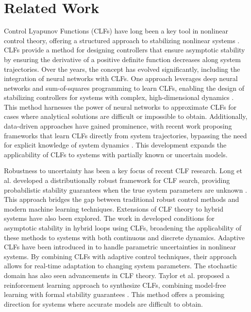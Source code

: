 \documentclass[11pt, oneside]{article}
\begin{document}
\section{Related Work}

 Control Lyapunov Functions (CLFs) have long been a key tool in nonlinear control theory, offering a structured approach to stabilizing nonlinear systems \cite{artstein1983stabilization,sontag1989universal}. CLFs provide a method for designing controllers that ensure asymptotic stability by ensuring the derivative of a positive definite function decreases along system trajectories. Over the years, the concept has evolved significantly, including the integration of neural networks with CLFs. One approach leverages deep neural networks and sum-of-squares programming to learn CLFs, enabling the design of stabilizing controllers for systems with complex, high-dimensional dynamics \cite{richards2018lyapunov}. This method harnesses the power of neural networks to approximate CLFs for cases where analytical solutions are difficult or impossible to obtain. Additionally, data-driven approaches have gained prominence, with recent work proposing frameworks that learn CLFs directly from system trajectories, bypassing the need for explicit knowledge of system dynamics \cite{ravanbakhsh2019learning}. This development expands the applicability of CLFs to systems with partially known or uncertain models.

Robustness to uncertainty has been a key focus of recent CLF research. Long et al. developed a distributionally robust framework for CLF search, providing probabilistic stability guarantees when the true system parameters are unknown \cite{long2023distributionally}. This approach bridges the gap between traditional robust control methods and modern machine learning techniques. Extensions of CLF theory to hybrid systems have also been explored. The work in \cite{goedel2012hybrid} developed conditions for asymptotic stability in hybrid loops using CLFs, broadening the applicability of these methods to systems with both continuous and discrete dynamics.
Adaptive CLFs have been introduced in \cite{xiao2019control} to handle parametric uncertainties in nonlinear systems. By combining CLFs with adaptive control techniques, their approach allows for real-time adaptation to changing system parameters.
The stochastic domain has also seen advancements in CLF theory. Taylor et al. proposed a reinforcement learning approach to synthesize CLFs, combining model-free learning with formal stability guarantees \cite{taylor2019episodic}. This method offers a promising direction for systems where accurate models are difficult to obtain.
\end{document}
